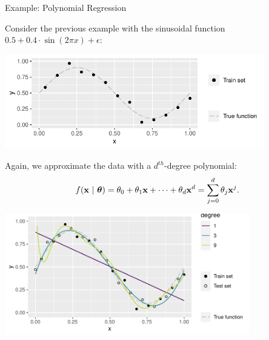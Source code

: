 \documentclass[11pt,compress,t,notes=noshow, xcolor=table]{beamer}
\begin{document}
% 
% 


\begin{vbframe}{Example: Polynomial Regression}

Consider the previous example with the sinusoidal function
$0.5 + 0.4 \cdot \sin (2 \pi x) + \epsilon$:

\vfill

\begin{center}
  \includegraphics[width=0.85\textwidth]{figure/eval_train_1}
\end{center}

Again, we approximate the data with a $d^{th}$-degree polynomial:
\[ f(\mathbf{x} ~|~ \bm{\theta}) = \theta_0 + \theta_1 \mathbf{x} + \cdots + \theta_d \mathbf{x}^d = \sum_{j = 0}^{d}
\theta_j \mathbf{x}^j\text. \]

\framebreak

\includegraphics[width=0.8\textwidth]{figure/eval_test_2} 


\end{vbframe}
\end{document}
